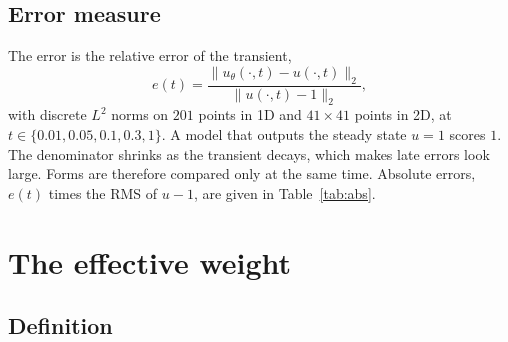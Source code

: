 \documentclass[a4paper,fleqn]{cas-sc}
\begin{document}
\subsection{Error measure}
\label{sec:error}

The error is the relative error of the transient,
\begin{equation}
e(t) = \frac{\|u_\theta(\cdot,t)-u(\cdot,t)\|_2}{\|u(\cdot,t)-1\|_2},
\label{eq:error}
\end{equation}
with discrete $L^2$ norms on $201$ points in 1D and $41\times41$ points in 2D, at $t\in\{0.01,0.05,0.1,0.3,1\}$. A model
that outputs the steady state $u=1$ scores $1$. The denominator shrinks as the transient decays, which makes late
errors look large. Forms are therefore compared only at the same time. Absolute errors, $e(t)$ times the RMS of $u-1$,
are given in Table~\ref{tab:abs}.

\section{The effective weight}
\label{sec:analysis}

\subsection{Definition}
\label{sec:effweight}
\end{document}
